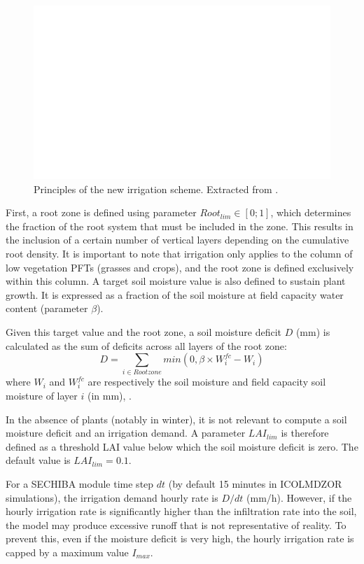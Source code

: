 \begin{figure}[t]
    \centering
    \includegraphics[width=1\textwidth]{images/schema_pedro.png}
    \caption{Principles of the new irrigation scheme. Extracted from \citet{arboleda-obando_validation_2024}.}
    \label{fig:schema_pedro}
\end{figure}

First, a root zone is defined using parameter $Root_{lim} \in [0;1]$, which determines the fraction of the root system that must be included in the zone. This results in the inclusion of a certain number of vertical layers depending on the cumulative root density. It is important to note that irrigation only applies to the column of low vegetation PFTs (grasses and crops), and the root zone is defined exclusively within this column.
A target soil moisture value is also defined to sustain plant growth. It is expressed as a fraction of the soil moisture at field capacity water content (parameter $\beta$).

Given this target value and the root zone, a soil moisture deficit $D$ (mm) is calculated as the sum of deficits across all layers of the root zone:
\begin{equation}
    D = \sum_{i \in Rootzone} min(0,\beta \times W_i^{fc} - W_i)
\end{equation}
where $W_i$ and $W_i^{fc}$ are respectively the soil moisture and field capacity soil moisture of layer $i$ (in mm), .

In the absence of plants (notably in winter), it is not relevant to compute a soil moisture deficit and an irrigation demand. A parameter $LAI_{lim}$ is therefore defined as a threshold LAI value below which the soil moisture deficit is zero. The default value is $LAI_{lim}=0.1$.

For a SECHIBA module time step $dt$ (by default 15 minutes in ICOLMDZOR simulations), the irrigation demand hourly rate is $D/dt$ (mm/h). However, if the hourly irrigation rate is significantly higher than the infiltration rate into the soil, the model may produce excessive runoff that is not representative of reality. To prevent this, even if the moisture deficit is very high, the hourly irrigation rate is capped by a maximum value $I_{max}$.

